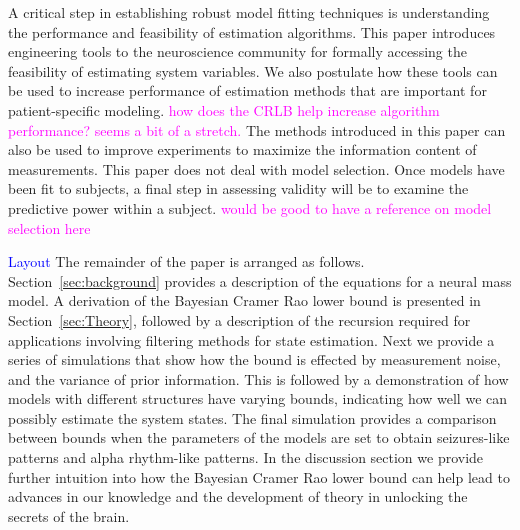 \documentclass{article}
\newcommand{\unit}[1]{\textcolor{magenta}{#1}}
\newcommand{\brian}[1]{\textcolor{blue}{#1}}
\begin{document}
A critical step in establishing robust model fitting techniques is understanding the performance and feasibility of estimation algorithms. This paper introduces engineering tools to the neuroscience community for formally accessing the feasibility of estimating system variables. We also postulate how these tools can be used to increase performance of estimation methods that are important for patient-specific modeling. \unit{how does the CRLB help increase algorithm performance? seems a bit of a stretch.} The methods introduced in this paper can also be used to improve experiments to maximize the information content of measurements. This paper does not deal with model selection. Once models have been fit to subjects, a final step in assessing validity will be to examine the predictive power within a subject.  \unit{would be good to have a reference on model selection here}

\brian{Layout}
The remainder of the paper is arranged as follows. Section~\ref{sec:background} provides a description of the equations for a neural mass model. A derivation of the Bayesian Cramer Rao lower bound is presented in Section~\ref{sec:Theory}, followed by a description of the recursion required for applications involving filtering methods for state estimation. Next we provide a series of simulations that show how the bound is effected by measurement noise, and the variance of prior information. This is followed by a demonstration of how models with different structures have varying bounds, indicating how well we can possibly estimate the system states. The final simulation provides a comparison between bounds when the parameters of the models are set to obtain seizures-like patterns and alpha rhythm-like patterns. In the discussion section we provide further intuition into how the Bayesian Cramer Rao lower bound can help lead to advances in our knowledge and the development of theory in unlocking the secrets of the brain.



\end{document}
